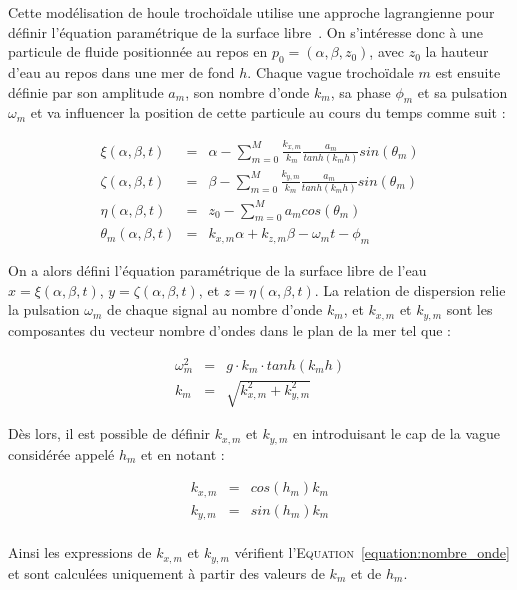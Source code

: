 				Cette modélisation de houle trochoïdale utilise une approche lagrangienne pour définir l'équation paramétrique de la surface libre~\cite{Gerstner, Constantin_2001, Gerstner-Like_Henry}. On s'intéresse donc à une particule de fluide positionnée au repos en $p_0=(\alpha, \beta, z_0)$, avec $z_0$ la hauteur d'eau au repos dans une mer de fond $h$. Chaque vague trochoïdale $m$ est ensuite définie par son amplitude $a_m$, son nombre d'onde $k_m$, sa phase $\phi_m$ et sa pulsation $\omega_m$ et va influencer la position de cette particule au cours du temps comme suit :

				\begin{eqnarray}
					\xi(\alpha, \beta, t) & = & \alpha - \sum_{m=0}^{M} \frac{k_{x, m}}{k_m} \frac{a_m}{tanh(k_mh)}sin(\theta_m) \\ 
					\zeta(\alpha, \beta, t) & = & \beta - \sum_{m=0}^{M} \frac{k_{y, m}}{k_m} \frac{a_m}{tanh(k_mh)}sin(\theta_m) \\ 
					\eta(\alpha, \beta, t) & = & z_0 - \sum_{m=0}^{M} a_m cos(\theta_m) \\ 
					\theta_m(\alpha, \beta, t) & = & k_{x, m} \alpha + k_{z, m} \beta - \omega_m t - \phi_m
				\end{eqnarray}

				On a alors défini l'équation paramétrique de la surface libre de l'eau $x = \xi(\alpha, \beta, t)$, $y = \zeta(\alpha, \beta, t)$, et $z = \eta(\alpha, \beta, t)$. La relation de dispersion relie la pulsation $\omega_m$ de chaque signal au nombre d'onde $k_m$, et $k_{x, m}$ et $k_{y, m}$ sont les composantes du vecteur nombre d'ondes dans le plan de la mer tel que  :
				
				\begin{eqnarray}
					\omega_m^2 & = & g \cdot k_m \cdot tanh(k_m h) \label{equation:dispersion} \\
					k_m & = & \sqrt{k_{x, m}^2 + k_{y, m}^2} \label{equation:nombre_onde}
				\end{eqnarray}

				Dès lors, il est possible de définir $k_{x, m}$ et $k_{y, m}$ en introduisant le cap de la vague considérée appelé $h_m$ et en notant :

				\begin{eqnarray}
					k_{x, m} & = & cos(h_m) k_m \\
					k_{y, m} & = & sin(h_m) k_m \\
				\end{eqnarray}

				Ainsi les expressions de $k_{x, m}$ et $k_{y, m}$ vérifient l'\textsc{Equation}~\ref{equation:nombre_onde} et sont calculées uniquement à partir des valeurs de $k_m$ et de $h_m$.
				
